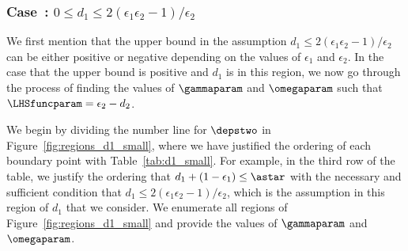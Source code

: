 \subsubsection{Case~: $0 \leq d_1 \leq 2(\epsilon_1\epsilon_2 - 1)/\epsilon_2$}



We first mention that the upper bound in the assumption $d_1 \leq 2(\epsilon_1\epsilon_2 - 1)/\epsilon_2$ can be either positive or negative depending on the values of $\epsilon_1$ and $\epsilon_2$.  In the case that the upper bound is positive and $d_1$ is in this region, we now go through the process of finding the values of $\gammaparam$ and $\omegaparam$ such that $\LHSfuncparam = \epsilon_2 - d_2$.  


We begin by dividing the number line for $\depstwo$ in Figure~\ref{fig:regions_d1_small}, where we have justified the ordering of each boundary point with Table~\ref{tab:d1_small}.  For example, in the third row of the table, we justify the ordering that $d_1 + (1 - \epsilon_1) \leq \astar$ with the necessary and sufficient condition that $d_1 \leq 2(\epsilon_1\epsilon_2 - 1)/\epsilon_2$, which is the assumption in this region of $d_1$ that we consider.  We enumerate all regions of Figure~\ref{fig:regions_d1_small} and provide the values of $\gammaparam$ and $\omegaparam$.


